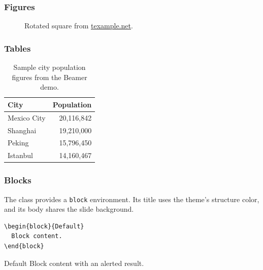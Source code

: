 \documentclass[10pt,aspect-ratio=4:3]{ltx-talk}
\begin{document}
\begin{frame}
  \frametitle{Figures}
  \begin{figure}
    \centering
    \setcounter{density}{20}
    \caption{Rotated square from
      \href{https://texample.net/tikz/examples/rotated-polygons/}{texample.net}.}
  \end{figure}
\end{frame}

\begin{frame}
  \frametitle{Tables}
  \begin{table}
    \centering
    \caption{Sample city population figures from the Beamer demo.}
    \begin{tabular}{@{} lr @{}}
      \toprule
      City        & Population \\
      \midrule
      Mexico City & 20,116,842 \\
      Shanghai    & 19,210,000 \\
      Peking      & 15,796,450 \\
      Istanbul    & 14,160,467 \\
      \bottomrule
    \end{tabular}
  \end{table}
\end{frame}

\begin{frame*}
  \frametitle{Blocks}
  The class provides a \verb|block| environment. Its title uses the theme's
  structure color, and its body shares the slide background.

  \begin{verbatim}
\begin{block}{Default}
  Block content.
\end{block}
  \end{verbatim}

  \begin{block}{Default}
    Block content with an \alert{alerted result}.
  \end{block}
\end{frame*}
\end{document}
